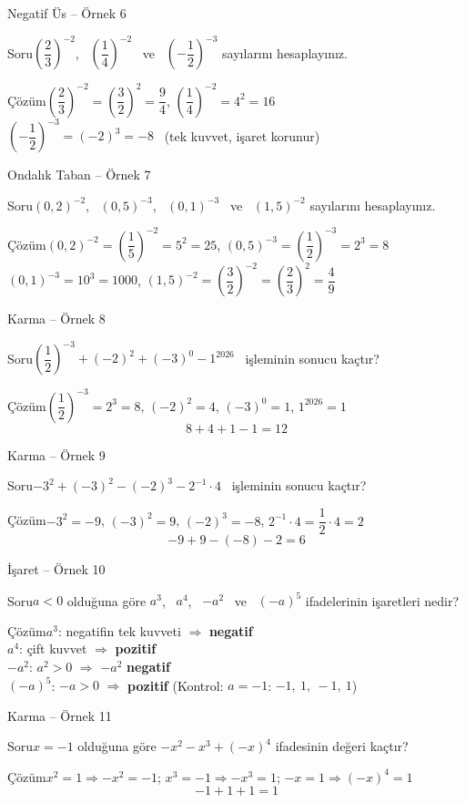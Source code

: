\documentclass[aspectratio=169,11pt,handout]{beamer}
\newcommand{\soru}[3]{%
\begin{frame}{#1}
  \begin{block}{Soru}\large #2\end{block}
  \pause
  \begin{exampleblock}{Çözüm}\large #3\end{exampleblock}
\end{frame}}
\begin{document}
\soru{Negatif Üs -- Örnek 6}
{\(\left(\dfrac23\right)^{-2}\), \ \(\left(\dfrac14\right)^{-2}\) \ ve \ \(\left(-\dfrac12\right)^{-3}\) sayılarını hesaplayınız.}
{\(\left(\dfrac23\right)^{-2}=\left(\dfrac32\right)^{2}=\dfrac94\), \qquad \(\left(\dfrac14\right)^{-2}=4^2=16\)\\[4pt]
\(\left(-\dfrac12\right)^{-3}=(-2)^3=-8\) \ (tek kuvvet, işaret korunur)}

\soru{Ondalık Taban -- Örnek 7}
{\((0{,}2)^{-2}\), \ \((0{,}5)^{-3}\), \ \((0{,}1)^{-3}\) \ ve \ \((1{,}5)^{-2}\) sayılarını hesaplayınız.}
{\((0{,}2)^{-2}=\left(\dfrac15\right)^{-2}=5^2=25\), \qquad \((0{,}5)^{-3}=\left(\dfrac12\right)^{-3}=2^3=8\)\\[4pt]
\((0{,}1)^{-3}=10^3=1000\), \qquad \((1{,}5)^{-2}=\left(\dfrac32\right)^{-2}=\left(\dfrac23\right)^{2}=\dfrac49\)}

\soru{Karma -- Örnek 8}
{\(\left(\dfrac12\right)^{-3}+(-2)^2+(-3)^0-1^{2026}\) \ işleminin sonucu kaçtır?}
{\(\left(\dfrac12\right)^{-3}=2^3=8\), \quad \((-2)^2=4\), \quad \((-3)^0=1\), \quad \(1^{2026}=1\)
\[8+4+1-1=12\]}

\soru{Karma -- Örnek 9}
{\(-3^2+(-3)^2-(-2)^3-2^{-1}\cdot 4\) \ işleminin sonucu kaçtır?}
{\(-3^2=-9\), \quad \((-3)^2=9\), \quad \((-2)^3=-8\), \quad \(2^{-1}\cdot 4=\dfrac12\cdot 4=2\)
\[-9+9-(-8)-2=6\]}

\soru{İşaret -- Örnek 10}
{\(a<0\) olduğuna göre \(a^3\), \ \(a^4\), \ \(-a^2\) \ ve \ \((-a)^5\) ifadelerinin işaretleri nedir?}
{\(a^3\): negatifin tek kuvveti \(\Rightarrow\) \textbf{negatif}\\[3pt]
\(a^4\): çift kuvvet \(\Rightarrow\) \textbf{pozitif}\\[3pt]
\(-a^2\): \(a^2>0\) \(\Rightarrow\) \(-a^2\) \textbf{negatif}\\[3pt]
\((-a)^5\): \(-a>0\) \(\Rightarrow\) \textbf{pozitif} \quad (Kontrol: \(a=-1\): \(-1,\ 1,\ -1,\ 1\))}

\soru{Karma -- Örnek 11}
{\(x=-1\) olduğuna göre \(-x^2-x^3+(-x)^4\) ifadesinin değeri kaçtır?}
{\(x^2=1\Rightarrow -x^2=-1\); \quad \(x^3=-1\Rightarrow -x^3=1\); \quad \(-x=1\Rightarrow(-x)^4=1\)
\[-1+1+1=1\]}
\end{document}
